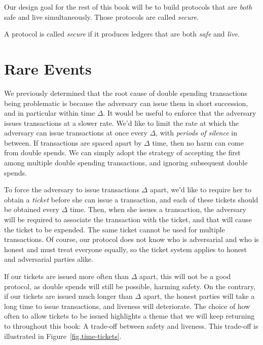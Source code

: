 Our design goal for the rest of this book will be to build protocols that
are \emph{both} safe and live simultaneously. Those protocols are called
\emph{secure}.

\begin{definition}[Security]
    A protocol is called \emph{secure} if it produces ledgers that are both
    \emph{safe} and \emph{live}.
\end{definition}

\section{Rare Events}
We previously determined that the root cause of double spending transactions being problematic
is because the adversary can issue them in short succession, and in particular within time
$\Delta$. It would be useful to enforce that the adversary issues transactions at a slower
rate. We'd like to limit the rate at which the adversary can issue transactions at
once every $\Delta$, with \emph{periods of silence} in between. If transactions are
spaced apart by $\Delta$ time, then no harm can come from double spends. We can simply
adopt the strategy of accepting the first among multiple double spending transactions,
and ignoring subsequent double spends.

To force the adversary to issue transactions $\Delta$ apart, we'd like to require her
to obtain a \emph{ticket} before she can issue a transaction, and each of these tickets
should be obtained every $\Delta$ time. Then, when she issues a transaction, the adversary
will be required to associate the transaction with the ticket, and that will cause the
ticket to be expended. The same ticket cannot be used for multiple transactions. Of course,
our protocol does not know who is adversarial and who is honest and must treat everyone
equally, so the ticket system applies to honest and adversarial parties alike.

If our tickets are issued more often than $\Delta$ apart, this will not be a good protocol,
as double spends will still be possible, harming safety. On the contrary, if our tickets
are issued much longer than $\Delta$ apart, the honest parties will take a long time to issue
transactions, and liveness will deteriorate. The choice of how often to allow tickets to be
issued highlights a theme that we will keep returning to throughout this book: A trade-off
between safety and liveness. This trade-off is illustrated in Figure~\ref{fig.time-tickets}.

